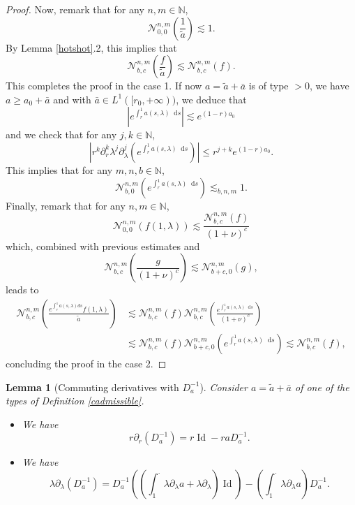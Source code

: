 \documentclass[11 pt]{amsart}
\newcommand{\tmop}[1]{\ensuremath{\operatorname{#1}}}
\newtheorem{lem}{Lemma}[section]
\theoremstyle{definition}
\theoremstyle{remark}
\numberwithin{equation}{section}
\newcommand{\dd}{\mathop{}\!\mathrm{d}}
\begin{document}
\begin{proof}
  Now, remark that for any $n, m \in \mathbb{N}$,
  \[ \mathcal{N}_{0, 0}^{n, m} \left( \frac{1}{\widetilde{a}} \right) \lesssim 1.
  \]
  By Lemma \ref{hotshot}.2, this implies that
  \[ \mathcal{N}_{b, c}^{n, m} \left( \frac{f}{\widetilde{a}} \right) \lesssim
     \mathcal{N}_{b, c}^{n, m} (f) . \]
  This completes the proof in the case 1. If now $a=\widetilde{a}+\bar{a}$ is of type $> 0$, we have $a \geq a_0 + \bar{a}$ and with $\bar{a} \in L^1 ([r_0, + \infty )) $, we deduce that
  \[ \left| e^{\int_r^1 a (s, \lambda)\dd s} \right| \lesssim e^{(1 -
     r) a_0} \]
and we check that for any $j, k \in \mathbb{N}$,
  \[ \left| r^k \partial_r^k \lambda^j \partial_{\lambda}^j \left( e^{\int_r^1
     a (s, \lambda)\dd s} \right) \right| \leqslant r^{j + k} e^{(1 -
     r) a_0} . \]
  This implies that for any $m, n, b \in \mathbb{N}$,
  \[ \mathcal{N}_{b, 0}^{n, m} \left( e^{\int_r^1 a (s, \lambda)\dd s} \right)
     \lesssim_{b,n,m} 1. \]
  Finally, remark that for any $n, m \in \mathbb{N}$,
  \[ \mathcal{N}_{0, 0}^{n, m} (f (1, \lambda)) \lesssim \frac{\mathcal{N}_{b,
     c}^{n, m} (f)}{(1 + \nu)^c} \]
  which, combined with previous estimates and
  \[ \mathcal{N}_{b, c}^{n, m} \left( \frac{g}{(1 + \nu)^c} \right) \lesssim
     \mathcal{N}_{b + c, 0}^{n, m} (g), \]
  leads to
  \begin{align*}
\mathcal{N}_{b, c}^{n, m} \left( \frac{e^{\int_r^1 a (s, \lambda) d
    s} f (1, \lambda)}{\widetilde{a}} \right) & \lesssim  \mathcal{N}_{b, c}^{n, m} (f) \mathcal{N}_{b, c}^{n, m}
    \left( \frac{e^{\int_r^1 a (s, \lambda)\dd s}}{(1 + \nu)^c} \right) \\
& \lesssim  \mathcal{N}_{b, c}^{n, m} (f) \mathcal{N}_{b + c, 0}^{n, m}
    \left( e^{\int_r^1 a (s, \lambda)\dd s} \right) \lesssim  \mathcal{N}_{b, c}^{n, m} (f),
  \end{align*}
  concluding the proof in the case 2.
\end{proof}

\begin{lem}[Commuting derivatives with $D_a^{-1}$] \label{unknown}Consider $a = \widetilde{a} + \bar{a}$ of one of the types of
  Definition \ref{cadmissible}.
\begin{itemize}
\item[1)] We have
  \[ r \partial_r (D_a^{- 1}) = r \tmop{Id} - r a D_a^{- 1} . \]
  
  
\item[2)] We have
  \[ \lambda \partial_{\lambda} (D_a^{- 1}) = D_a^{- 1} \left( \left( \int_1^\cdot
     \lambda \partial_{\lambda} a + \lambda \partial_{\lambda} \right)
     \tmop{Id} \right) - \left( \int_1^\cdot \lambda \partial_{\lambda} a \right)
     D_a^{- 1} . \]
\end{itemize}
\end{lem}
\end{document}
